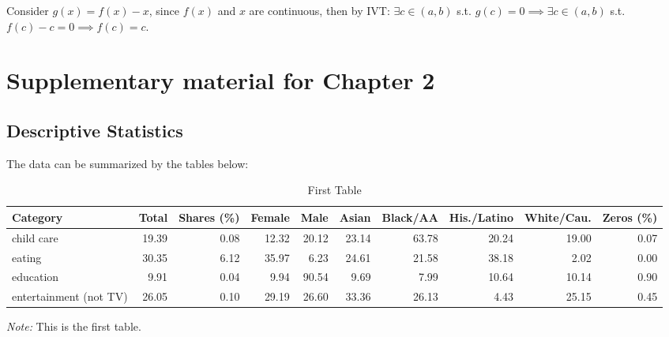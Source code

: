 \documentclass[letterpaper]{report}
\begin{document}
\begin{appendices}
  \begin{framed}
  Consider $g(x)=f(x)-x$, since $f(x)$ and $x$ are continuous, then by IVT: $\exists c\in(a,b)$ s.t. $g(c)=0\implies \exists c\in(a,b)$ s.t. $f(c)-c=0\implies f(c)=c.$
\end{framed}
  
  \chapter{Supplementary material for Chapter 2}
  
  \setcounter{table}{0}
  
  \section{Descriptive Statistics}
  
  The data can be summarized by the tables below:
  
  \renewcommand*\arraystretch{1.7}
  \renewcommand{\tabcolsep}{2.5pt}
  \begin{table}[H]
    \centering
    \renewcommand{\thetable}{B.\arabic{table}a}
    \caption{First Table}
    \label{summary_a}
    \fontsize{10.5}{10.5}\selectfont
    \hspace*{0cm}\begin{tabular}{lrrrrrrrrr}
    \toprule
    Category                   & Total & Shares (\%) & Female & Male  & Asian & Black/AA & His./Latino & White/Cau. & Zeros (\%) \\ \hline
    child care                 & 19.39 & 0.08   & 12.32  & 20.12 & 23.14 & 63.78    & 20.24       & 19.00      & 0.07  \\
    eating                     & 30.35 & 6.12   & 35.97  & 6.23 & 24.61 & 21.58    & 38.18       & 2.02      & 0.00  \\
    education                  & 9.91  & 0.04   & 9.94   & 90.54  & 9.69  & 7.99     & 10.64        & 10.14      & 0.90  \\
    entertainment (not TV)     & 26.05 & 0.10   & 29.19  & 26.60 & 33.36 & 26.13    & 4.43       & 25.15      & 0.45  \\ \bottomrule
  \end{tabular}
  \hspace*{-0.65cm}
  \begin{minipage}{1.05\textwidth}
    \onehalfspacing
    \vspace*{0.05cm}
    \begin{tablenotes}
      \footnotesize
      \item\textit{Note:} This is the first table.
    \end{tablenotes}
  \end{minipage}
\end{table}


\end{appendices}
\end{document}
